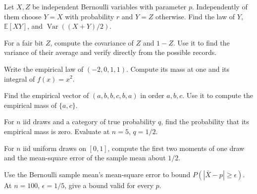 \documentclass[11pt,oneside]{book}
\theoremstyle{definition}
\theoremstyle{remark}
\begin{document}
\begin{practiceexercise}
\label{wex:partial-copy-covariance}
Let $X,Z$ be independent Bernoulli variables with parameter $p$.
Independently of them choose $Y=X$ with probability $r$ and $Y=Z$ otherwise.
Find the law of $Y$, $\mathbb E[XY]$, and $\operatorname{Var}((X+Y)/2)$.
\end{practiceexercise}

\begin{practiceexercise}
\label{wex:paired-complement-mean}
For a fair bit $Z$, compute the covariance of $Z$ and $1-Z$. Use it to find
the variance of their average and verify directly from the possible records.
\end{practiceexercise}

\begin{practiceexercise}
\label{wex:empirical-feature-square}
Write the empirical law of $(-2,0,1,1)$. Compute its mass at one and its
integral of $f(x)=x^2$.
\end{practiceexercise}

\begin{practiceexercise}
\label{wex:empirical-category-subset}
Find the empirical vector of $(a,b,b,c,b,a)$ in order $a,b,c$. Use it to
compute the empirical mass of $\{a,c\}$.
\end{practiceexercise}

\begin{practiceexercise}
\label{wex:empirical-unseen-category}
For $n$ iid draws and a category of true probability $q$, find the
probability that its empirical mass is zero. Evaluate at $n=5$, $q=1/2$.
\end{practiceexercise}

\begin{practiceexercise}
\label{wex:uniform-mean-square}
For $n$ iid uniform draws on $[0,1]$, compute the first two moments of one
draw and the mean-square error of the sample mean about $1/2$.
\end{practiceexercise}

\begin{practiceexercise}
\label{wex:coin-error-probability}
Use the Bernoulli sample mean's mean-square error to bound $P(|\bar
X-p|\ge\epsilon)$. At $n=100$, $\epsilon=1/5$, give a bound valid for every
$p$.
\end{practiceexercise}
\end{document}
